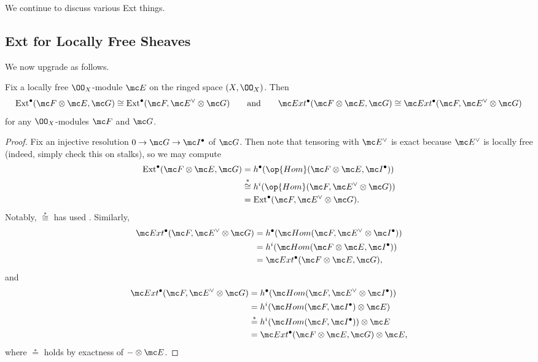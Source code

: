 \documentclass[../notes.tex]{subfiles}
\begin{document}
We continue to discuss various Ext things.

\subsection{Ext for Locally Free Sheaves}
We now upgrade  as follows.
\begin{proposition} \label{prop:ext-locally-free}
	Fix a locally free $\OO_X$-module $\mc E$ on the ringed space $(X,\OO_X)$. Then
	\[\mathrm{Ext}^\bullet(\mc F\otimes\mc E,\mc G)\cong\mathrm{Ext}^\bullet(\mc F,\mc E^\lor\otimes\mc G)\qquad\text{and}\qquad\mc Ext^\bullet(\mc F\otimes\mc E,\mc G)\cong\mc Ext^\bullet(\mc F,\mc E^\lor\otimes\mc G)\]
	for any $\OO_X$-modules $\mc F$ and $\mc G$.
\end{proposition}
\begin{proof}
	Fix an injective resolution $0\to\mc G\to\mc I^\bullet$ of $\mc G$. Then note that tensoring with $\mc E^\lor$ is exact because $\mc E^\lor$ is locally free (indeed, simply check this on stalks), so we may compute
	\begin{align*}
		\mathrm{Ext}^\bullet(\mc F\otimes\mc E,\mc G) &= h^\bullet(\op{Hom}(\mc F\otimes\mc E,\mc I^\bullet)) \\
		&\stackrel*\cong h^i(\op{Hom}(\mc F,\mc E^\lor\otimes\mc G)) \\
		&=\mathrm{Ext}^\bullet(\mc F,\mc E^\lor\otimes\mc G).
	\end{align*}
	Notably, $\stackrel*\cong$ has used . Similarly,
	\begin{align*}
		\mc Ext^\bullet(\mc F,\mc E^\lor\otimes\mc G) &= h^\bullet(\mc Hom(\mc F,\mc E^\lor\otimes\mc I^\bullet)) \\
		&= h^i(\mc Hom(\mc F\otimes\mc E,\mc I^\bullet)) \\
		&= \mc Ext^\bullet(\mc F\otimes\mc E,\mc G),
	\end{align*}
	and
	\begin{align*}
		\mc Ext^\bullet(\mc F,\mc E^\lor\otimes\mc G) &= h^\bullet(\mc Hom(\mc F,\mc E^\lor\otimes\mc I^\bullet)) \\
		&= h^i(\mc Hom(\mc F,\mc I^\bullet)\otimes\mc E) \\
		&\stackrel*= h^i(\mc Hom(\mc F,\mc I^\bullet))\otimes\mc E \\
		&= \mc Ext^\bullet(\mc F\otimes\mc E,\mc G)\otimes\mc E,
	\end{align*}
	where $\stackrel*=$ holds by exactness of $-\otimes\mc E$.
\end{proof}
\end{document}
